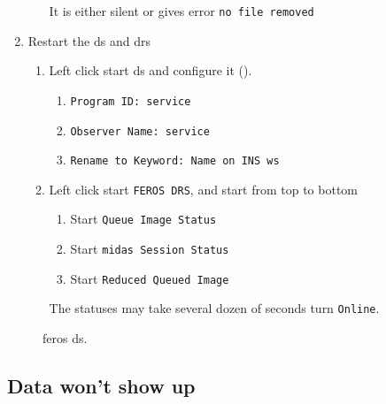 \documentclass[11pt,fleqn,a4paper]{book}
\begin{document}
\begin{enumerate}
\begin{enumerate}
          It is either silent or gives error \texttt{no file removed}
    \end{enumerate}
    \item Restart the \gls{ds} and \gls{drs}
    \begin{enumerate}
        \item \label{list:DS} Left click start \gls{ds} and configure it  ().
            \begin{enumerate}
                \item \texttt{Program ID: service}
                \item \texttt{Observer Name: service}
                \item \texttt{Rename to Keyword: Name on INS ws}
             \end{enumerate}
        \item \label{list:DRS} Left click start \texttt{FEROS DRS}, and start from top to bottom
            \begin{enumerate}
                \item Start \texttt{Queue Image Status}
                \item Start \texttt{\gls{midas} Session Status}
                \item Start \texttt{Reduced Queued Image}
            \end{enumerate}
            The statuses may take several dozen of seconds turn \texttt{Online}. 
    \end{enumerate}
\end{enumerate}
  

\begin{figure}[t!]
\begin{minipage}{0.48\linewidth}
\end{minipage}
\hspace{0.02\linewidth}
\begin{minipage}{0.48\linewidth}
\end{minipage}
\caption[FEROS DRS]{\gls{feros} \gls{ds}.}
\end{figure}

\subsection{Data won't show up}
\end{document}
